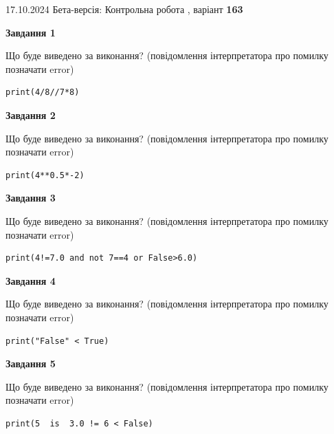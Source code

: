 \documentclass[12pt, ukrainian]{article}
\begin{document}
{\Large{17.10.2024 Бета-версія: Контрольна робота , варіант  \No \textbf { 163 }\par}}
{
\begin {large}
{\begin {center}\textbf{Завдання 1}\end {center}}

Що буде виведено за виконання? (повідомлення інтерпретатора про помилку позначати error)\par
\begin{verbatim}
print(4/8//7*8)
\end{verbatim}

{\begin {center}\textbf{Завдання 2}\end {center}}

Що буде виведено за виконання? (повідомлення інтерпретатора про помилку позначати error)\par
\begin{verbatim}
print(4**0.5*-2)
\end{verbatim}

{\begin {center}\textbf{Завдання 3}\end {center}}

Що буде виведено за виконання? (повідомлення інтерпретатора про помилку позначати error)\par
\begin{verbatim}
print(4!=7.0 and not 7==4 or False>6.0)
\end{verbatim}

{\begin {center}\textbf{Завдання 4}\end {center}}

Що буде виведено за виконання? (повідомлення інтерпретатора про помилку позначати error)\par
\begin{verbatim}
print("False" < True)
\end{verbatim}

{\begin {center}\textbf{Завдання 5}\end {center}}

Що буде виведено за виконання? (повідомлення інтерпретатора про помилку позначати error)\par
\begin{verbatim}
print(5  is  3.0 != 6 < False)
\end{verbatim}


\end{large}}
\end{document}
